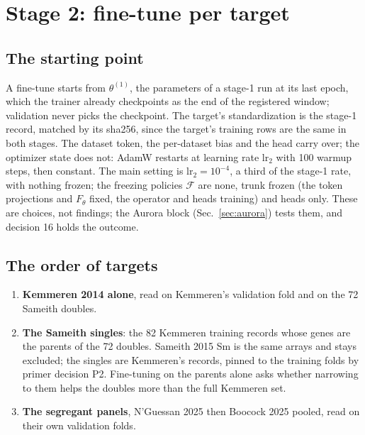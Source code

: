 
\section{Stage 2: fine-tune per target}
\label{sec:stage2}

\subsection{The starting point}
\label{sec:ftstart}

A fine-tune starts from $\theta^{(1)}$, the parameters of a stage-1 run at its last epoch,
which the trainer already checkpoints as the end of the registered window; validation never
picks the checkpoint. The target's standardization is the stage-1 record, matched by its
sha256, since the target's training rows are the same in both stages. The dataset token,
the per-dataset bias and the head carry over; the optimizer state does not: AdamW restarts at
learning rate $\mathrm{lr}_2$ with 100 warmup steps, then constant. The main setting is
$\mathrm{lr}_2 = 10^{-4}$, a third of the stage-1 rate, with nothing frozen; the freezing
policies $\mathcal{F}$ are none, trunk frozen (the token projections and $F_\theta$ fixed, the
operator and heads training) and heads only. These are choices, not findings; the Aurora block
(Sec.~\ref{sec:aurora}) tests them, and decision 16 holds the outcome.

\subsection{The order of targets}
\label{sec:fttargets}

\begin{enumerate}[leftmargin=*,itemsep=2pt]
\item \textbf{Kemmeren 2014 alone}, read on Kemmeren's validation fold and on the 72 Sameith
doubles.
\item \textbf{The Sameith singles}: the 82 Kemmeren training records whose genes are the
parents of the 72 doubles. Sameith 2015 Sm is the same arrays and stays excluded; the singles
are Kemmeren's records, pinned to the training folds by primer decision P2. Fine-tuning on the
parents alone asks whether narrowing to them helps the doubles more than the full Kemmeren set.
\item \textbf{The segregant panels}, N'Guessan 2025 then Boocock 2025 pooled, read on their
own validation folds.
\end{enumerate}

